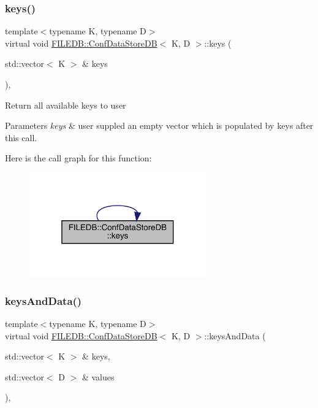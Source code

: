 \subsubsection{\texorpdfstring{keys()}{keys()}\hspace{0.1cm}{\footnotesize\ttfamily [2/2]}}
{\footnotesize\ttfamily template$<$typename K, typename D$>$ \\
virtual void \mbox{\hyperlink{classFILEDB_1_1ConfDataStoreDB}{F\+I\+L\+E\+D\+B\+::\+Conf\+Data\+Store\+DB}}$<$ K, D $>$\+::keys (\begin{DoxyParamCaption}\item[{std\+::vector$<$ K $>$ \&}]{keys }\end{DoxyParamCaption})\hspace{0.3cm}{\ttfamily [inline]}, {\ttfamily [virtual]}}

Return all available keys to user 
\begin{DoxyParams}{Parameters}
{\em keys} & user suppled an empty vector which is populated by keys after this call. \\
\hline
\end{DoxyParams}
Here is the call graph for this function\+:\nopagebreak
\begin{figure}[H]
\begin{center}
\leavevmode
\includegraphics[width=217pt]{d8/d19/classFILEDB_1_1ConfDataStoreDB_a794e05e3888ab95e0396a196b5a18e65_cgraph}
\end{center}
\end{figure}
\mbox{\label{classFILEDB_1_1ConfDataStoreDB_a94333e6aab463fd336bffb28d81dd39d}} 
\subsubsection{\texorpdfstring{keysAndData()}{keysAndData()}\hspace{0.1cm}{\footnotesize\ttfamily [1/2]}}
{\footnotesize\ttfamily template$<$typename K, typename D$>$ \\
virtual void \mbox{\hyperlink{classFILEDB_1_1ConfDataStoreDB}{F\+I\+L\+E\+D\+B\+::\+Conf\+Data\+Store\+DB}}$<$ K, D $>$\+::keys\+And\+Data (\begin{DoxyParamCaption}\item[{std\+::vector$<$ K $>$ \&}]{keys,  }\item[{std\+::vector$<$ D $>$ \&}]{values }\end{DoxyParamCaption})\hspace{0.3cm}{\ttfamily [inline]}, {\ttfamily [virtual]}}

